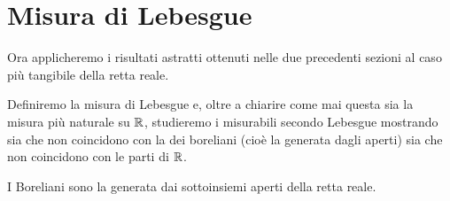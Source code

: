 \section{Misura di Lebesgue}
Ora applicheremo i risultati astratti ottenuti nelle due precedenti sezioni al caso più tangibile della retta reale.

Definiremo la misura di Lebesgue e, oltre a chiarire come mai questa sia la misura più naturale su $\mathbb R$, studieremo i misurabili secondo Lebesgue mostrando sia che non coincidono con la \sigalg{} dei boreliani (cioè la \sigalg{} generata dagli aperti) sia che non coincidono con le parti di $\mathbb R$.

\begin{definition}
	I Boreliani sono la \sigalg{} generata dai sottoinsiemi aperti della retta reale.
\end{definition}

\newcommand{\so}[2]{\ensuremath{[\,#1,\,#2\,)}}
\newcommand{\oo}[2]{\ensuremath{(\,#1,\,#2\,)}}
\newcommand{\cc}[2]{\ensuremath{[\,#1,\,#2\,]}}

